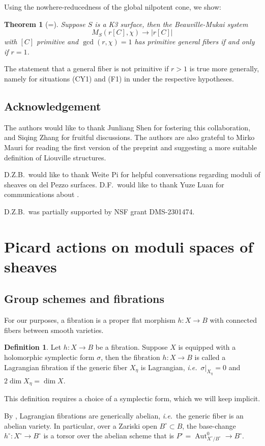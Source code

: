 \documentclass{amsart}
\theoremstyle{plain}
\newtheorem{theorem}{Theorem}[section]
\theoremstyle{definition}
\newtheorem{definition}{Definition}[section]
\theoremstyle{remark}
\begin{document}
Using the nowhere-reducedness of the global nilpotent cone, we show:
\begin{theorem}[=]
    Suppose $S$ is a K3 surface, then the Beauville-Mukai system
    \[M_S(r[C],\chi)\to |r[C]|\]
    with $[C]$ primitive and $\gcd(r,\chi)=1$ has primitive general fibers if and only if $r=1$.
\end{theorem}
The statement that a general fiber is not primitive if $r>1$ is true more generally, namely for situations (CY1) and (F1) in  under the respective hypotheses.

\subsection*{Acknowledgement}
The authors would like to thank Junliang Shen for fostering this collaboration, and Siqing Zhang for fruitful discussions.
The authors are also grateful to Mirko Mauri for reading the first version of the preprint and suggesting a more suitable definition of Liouville structures.

D.Z.B.~would like to thank Weite Pi for helpful conversations regarding moduli of sheaves on del Pezzo surfaces.
D.F.~would like to thank Yuze Luan for communications about \cite{luan}.

D.Z.B.~was partially supported by NSF grant DMS-2301474.

\section{Picard actions on moduli spaces of sheaves}
\subsection{Group schemes and fibrations}
For our purposes, a fibration is a proper flat morphism $h:X\to B$ with connected fibers between smooth varieties.

\begin{definition}
    Let $h:X\to B$ be a fibration.
    Suppose $X$ is equipped with a holomorphic symplectic form $\sigma$, then the fibration $h:X\to B$ is called a Lagrangian fibration if the generic fiber $X_\eta$ is Lagrangian, \emph{i.e.}~$\sigma|_{X_\eta}=0$ and $2\dim X_\eta=\dim X$.
\end{definition}
This definition requires a choice of a symplectic form, which we will keep implicit.

By \cite{beauville91}, Lagrangian fibrations are generically abelian, \emph{i.e.}~the generic fiber is an abelian variety.
In particular, over a Zariski open $B^\circ\subset B$, the base-change $h^\circ:X^\circ\to B^\circ$ is a torsor over the abelian scheme that is $P^\circ=\operatorname{Aut}_{X^\circ/B^\circ}^0\to B^\circ$.
\end{document}
